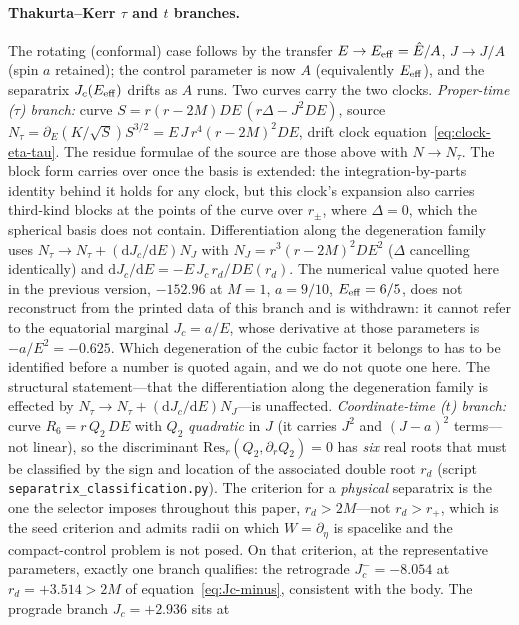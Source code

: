 \documentclass[12pt]{iopart}
\theoremstyle{plain}
\theoremstyle{definition}
\theoremstyle{remark}
\newcommand{\Ehat}{\hat E}
\newcommand{\rp}{r_{+}}
\newcommand{\Jc}{J_{c}}
\newcommand{\dd}{\mathrm{d}}
\begin{document}
\paragraph{Thakurta--Kerr $\tau$ and $t$ branches.}
The rotating (conformal) case follows by the transfer $E\to E_{\rm eff}=\Ehat/A$,
$J\to J/A$ (spin $a$ retained); the control parameter is now $A$ (equivalently $E_{\rm eff}$), and
the separatrix $\Jc(E_{\rm eff})$ drifts as $A$ runs. Two curves carry the two clocks.
\emph{Proper-time ($\tau$) branch:} curve $S=r(r-2M)DE\,(r\Delta-J^2DE)$, source
$N_\tau=\partial_E(K/\sqrt S)S^{3/2}=E\,J\,r^4(r-2M)^2DE$, drift clock
equation~\eqref{eq:clock-eta-tau}. The residue formulae of the source are those above
with $N\to N_\tau$. The block form carries over once the basis is extended: the
integration-by-parts identity behind it holds for any clock, but this clock's expansion
also carries third-kind blocks at the points of the curve over $r_\pm$, where $\Delta=0$,
which the spherical basis does not contain. Differentiation along the degeneration family uses $N_\tau\to N_\tau+(\dd\Jc/\dd E)N_J$ with
$N_J=r^3(r-2M)^2DE^2$ ($\Delta$ cancelling identically) and
$\dd\Jc/\dd E=-E\,\Jc\,r_d/DE(r_d)$. The numerical value quoted here in the
previous version, $-152.96$ at $M=1$, $a=9/10$, $E_{\rm eff}=6/5$, does not
reconstruct from the printed data of this branch and is withdrawn: it cannot
refer to the equatorial marginal $\Jc=a/E$, whose derivative at those parameters
is $-a/E^2=-0.625$. Which degeneration of the cubic factor it belongs to has to
be identified before a number is quoted again, and we do not quote one here. The
structural statement---that the differentiation along the degeneration family is
effected by $N_\tau\to N_\tau+(\dd\Jc/\dd E)N_J$---is unaffected.
\emph{Coordinate-time ($t$) branch:} curve $R_6=r\,Q_2\,DE$ with $Q_2$
\emph{quadratic} in $J$ (it carries $J^2$ and $(J-a)^2$ terms---not linear), so the
discriminant $\mathrm{Res}_r(Q_2,\partial_r Q_2)=0$ has \emph{six} real roots that
must be classified by the sign and location of the associated double root $r_d$
(script \texttt{separatrix\_classification.py}). The criterion for a
\emph{physical} separatrix is the one the selector imposes throughout this
paper, $r_d>2M$---not $r_d>\rp$, which is the seed criterion and admits radii on
which $W=\partial_\eta$ is spacelike and the compact-control problem is not
posed. On that criterion, at the representative parameters, exactly one branch qualifies: the retrograde
$\Jc^-=-8.054$ at $r_d=+3.514>2M$ of equation~\eqref{eq:Jc-minus}, consistent
with the body. The prograde branch $\Jc=+2.936$ sits at
\end{document}
